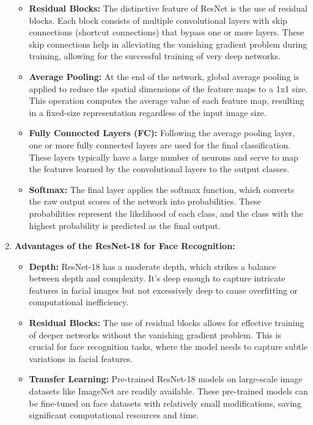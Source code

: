 \documentclass{article}
\begin{document}
\begin{enumerate}
\begin{itemize}
        \item \textbf{Residual Blocks:} The distinctive feature of ResNet is the use of residual blocks. Each block consists of multiple convolutional layers with skip connections (shortcut connections) that bypass one or more layers. These skip connections help in alleviating the vanishing gradient problem during training, allowing for the successful training of very deep networks.

        \item \textbf{Average Pooling:} At the end of the network, global average pooling is applied to reduce the spatial dimensions of the feature maps to a 1x1 size. This operation computes the average value of each feature map, resulting in a fixed-size representation regardless of the input image size.

        \item \textbf{Fully Connected Layers (FC):} Following the average pooling layer, one or more fully connected layers are used for the final classification. These layers typically have a large number of neurons and serve to map the features learned by the convolutional layers to the output classes.   
        
        \item \textbf{Softmax:} The final layer applies the softmax function, which converts the raw output scores of the network into probabilities. These probabilities represent the likelihood of each class, and the class with the highest probability is predicted as the final output.
    \end{itemize}

    \item \textbf{Advantages of the ResNet-18 for Face Recognition:}

    \begin{itemize}
        \item \textbf{Depth:} ResNet-18 has a moderate depth, which strikes a balance between depth and complexity. It's deep enough to capture intricate features in facial images but not excessively deep to cause overfitting or computational inefficiency.

        \item \textbf{Residual Blocks:} The use of residual blocks allows for effective training of deeper networks without the vanishing gradient problem. This is crucial for face recognition tasks, where the model needs to capture subtle variations in facial features.

        \item \textbf{Transfer Learning:} Pre-trained ResNet-18 models on large-scale image datasets like ImageNet are readily available. These pre-trained models can be fine-tuned on face datasets with relatively small modifications, saving significant computational resources and time.


\end{itemize}
\end{enumerate}
\end{document}
